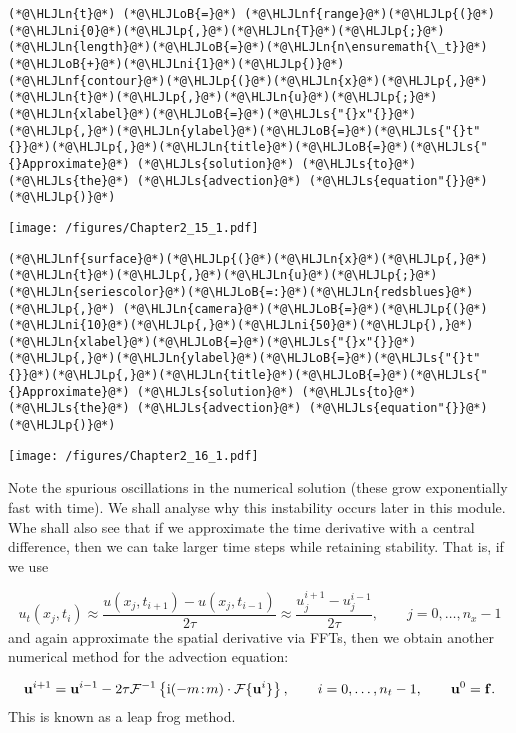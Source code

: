 \documentclass[12pt,landscape]{article}
\newcommand{\HLJLn}[1]{#1}
\newcommand{\HLJLnf}[1]{\textcolor[RGB]{66,102,213}{#1}}
\newcommand{\HLJLs}[1]{\textcolor[RGB]{201,61,57}{#1}}
\newcommand{\HLJLni}[1]{\textcolor[RGB]{59,151,46}{#1}}
\newcommand{\HLJLoB}[1]{\textcolor[RGB]{102,102,102}{\textbf{#1}}}
\newcommand{\HLJLp}[1]{#1}
\begin{document}
{\begin{lstlisting}
(*@\HLJLn{t}@*) (*@\HLJLoB{=}@*) (*@\HLJLnf{range}@*)(*@\HLJLp{(}@*)(*@\HLJLni{0}@*)(*@\HLJLp{,}@*)(*@\HLJLn{T}@*)(*@\HLJLp{;}@*)(*@\HLJLn{length}@*)(*@\HLJLoB{=}@*)(*@\HLJLn{n\ensuremath{\_t}}@*)(*@\HLJLoB{+}@*)(*@\HLJLni{1}@*)(*@\HLJLp{)}@*)
(*@\HLJLnf{contour}@*)(*@\HLJLp{(}@*)(*@\HLJLn{x}@*)(*@\HLJLp{,}@*)(*@\HLJLn{t}@*)(*@\HLJLp{,}@*)(*@\HLJLn{u}@*)(*@\HLJLp{;}@*)(*@\HLJLn{xlabel}@*)(*@\HLJLoB{=}@*)(*@\HLJLs{"{}x"{}}@*)(*@\HLJLp{,}@*)(*@\HLJLn{ylabel}@*)(*@\HLJLoB{=}@*)(*@\HLJLs{"{}t"{}}@*)(*@\HLJLp{,}@*)(*@\HLJLn{title}@*)(*@\HLJLoB{=}@*)(*@\HLJLs{"{}Approximate}@*) (*@\HLJLs{solution}@*) (*@\HLJLs{to}@*) (*@\HLJLs{the}@*) (*@\HLJLs{advection}@*) (*@\HLJLs{equation"{}}@*)(*@\HLJLp{)}@*)
\end{lstlisting}

\texttt{[image: /figures/Chapter2\_15\_1.pdf]}

\begin{lstlisting}
(*@\HLJLnf{surface}@*)(*@\HLJLp{(}@*)(*@\HLJLn{x}@*)(*@\HLJLp{,}@*)(*@\HLJLn{t}@*)(*@\HLJLp{,}@*)(*@\HLJLn{u}@*)(*@\HLJLp{;}@*)(*@\HLJLn{seriescolor}@*)(*@\HLJLoB{=:}@*)(*@\HLJLn{redsblues}@*)(*@\HLJLp{,}@*) (*@\HLJLn{camera}@*)(*@\HLJLoB{=}@*)(*@\HLJLp{(}@*)(*@\HLJLni{10}@*)(*@\HLJLp{,}@*)(*@\HLJLni{50}@*)(*@\HLJLp{),}@*)
(*@\HLJLn{xlabel}@*)(*@\HLJLoB{=}@*)(*@\HLJLs{"{}x"{}}@*)(*@\HLJLp{,}@*)(*@\HLJLn{ylabel}@*)(*@\HLJLoB{=}@*)(*@\HLJLs{"{}t"{}}@*)(*@\HLJLp{,}@*)(*@\HLJLn{title}@*)(*@\HLJLoB{=}@*)(*@\HLJLs{"{}Approximate}@*) (*@\HLJLs{solution}@*) (*@\HLJLs{to}@*) (*@\HLJLs{the}@*) (*@\HLJLs{advection}@*) (*@\HLJLs{equation"{}}@*)(*@\HLJLp{)}@*)
\end{lstlisting}

\texttt{[image: /figures/Chapter2\_16\_1.pdf]}

Note the spurious oscillations in the numerical solution (these grow exponentially fast with time).  We shall analyse why this instability occurs later in this module.  Whe shall also see that if we approximate the time derivative with a central difference, then we can take larger time steps while retaining stability. That is, if we use

\[
u_t(x_j,t_i) \approx \frac{u(x_j,t_{i+1}) - u(x_j,t_{i-1})}{2\tau} \approx \frac{u^{i+1}_j - u^{i-1}_j}{2\tau}, \qquad j = 0, \ldots, n_x-1
\]
and again approximate the spatial derivative via FFTs, then we obtain another numerical method for the advection equation:

\[
\mathbf{u}^{i+1} = \mathbf{u}^{i-1} - 2\tau \mathcal{F}^{-1}\left\lbrace {\rm i}(-m\!:\!m)\cdot\mathcal{F}\lbrace \mathbf{u}^{i} \rbrace\right\rbrace, \qquad i = 0, \ldots, n_t-1, \qquad \mathbf{u}^0 = \mathbf{f}.
\]
This is known as a leap frog method.

}
\end{document}
